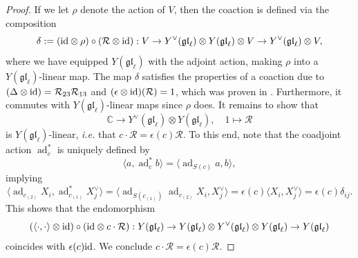\documentclass[11pt]{report}
\newtheorem{lemma}[theorem]{Lemma}
\theoremstyle{definition}
\theoremstyle{remark}
\theoremstyle{remark}
\newcommand{\End}{\operatorname{End}}
\newcommand{\id}{\textnormal{id}}
\newcommand{\C}{\mathbb{C}}
\begin{document}
\begin{proof}
If we let $\rho$ denote the action of $V$, then the coaction is defined via the composition
\begin{equation*}
\delta := (\id \otimes \rho) \circ (\mathcal{R} \otimes \id): V \to Y^\vee(\mathfrak{gl}_\ell) \otimes Y(\mathfrak{gl}_\ell) \otimes V \to Y^\vee(\mathfrak{gl}_\ell) \otimes V,
\end{equation*}
where we have equipped $Y(\mathfrak{gl}_\ell)$ with the adjoint action, making $\rho$ into a $Y(\mathfrak{gl}_\ell)$-linear map. The map $\delta$ satisfies the properties of a coaction due to $(\Delta \otimes \id) = \mathcal{R}_{23} \mathcal{R}_{13}$ and $(\epsilon \otimes \id)(\mathcal{R}) = 1$, which was proven in \cite{article:nazarov:2019}. Furthermore, it commutes with $Y(\mathfrak{gl}_\ell)$-linear maps since $\rho$ does. It remains to show that
\begin{equation*}
\C \to Y^\vee(\mathfrak{gl}_\ell) \otimes Y(\mathfrak{gl}_\ell), \quad 1 \mapsto \mathcal{R}
\end{equation*}
is $Y(\mathfrak{gl}_\ell)$-linear, \emph{i.e.} that $c \cdot \mathcal{R} = \epsilon(c) \mathcal{R}$. To this end, note that the coadjoint action $\operatorname{ad}_c^*$ is uniquely defined by
\begin{equation*}
\langle a,\operatorname{ad}_c^* b \rangle = \langle \operatorname{ad}_{S(c)} a,b \rangle,
\end{equation*}
implying
\begin{equation*}
\langle \operatorname{ad}_{c_{(2)}} X_i, \operatorname{ad}_{c_{(1)}}^* X_j^\vee \rangle = \langle \operatorname{ad}_{S(c_{(1)})} \operatorname{ad}_{c_{(2)}} X_i, X_j^\vee \rangle = \epsilon(c) \langle X_i,X_j^\vee \rangle = \epsilon(c) \delta_{ij}.
\end{equation*}
This shows that the endomorphism
\begin{equation*}
(\langle \cdot,\cdot \rangle \otimes \id) \circ (\id \otimes c \cdot \mathcal{R}): Y(\mathfrak{gl}_\ell) \to Y(\mathfrak{gl}_\ell) \otimes Y^\vee(\mathfrak{gl}_\ell) \otimes Y(\mathfrak{gl}_\ell) \to Y(\mathfrak{gl}_\ell)
\end{equation*}
coincides with $\epsilon(c) \id$. We conclude $c \cdot \mathcal{R} = \epsilon(c) \mathcal{R}$.
\end{proof}

%
\end{document}
